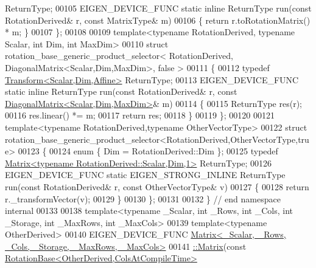 \begin{DoxyCode}
      ReturnType;
00105   EIGEN\_DEVICE\_FUNC \textcolor{keyword}{static} \textcolor{keyword}{inline} ReturnType run(\textcolor{keyword}{const} RotationDerived& r, \textcolor{keyword}{const} MatrixType& m)
00106   \{ \textcolor{keywordflow}{return} r.toRotationMatrix() * m; \}
00107 \};
00108 
00109 \textcolor{keyword}{template}<\textcolor{keyword}{typename} RotationDerived, \textcolor{keyword}{typename} Scalar, \textcolor{keywordtype}{int} Dim, \textcolor{keywordtype}{int} MaxDim>
00110 \textcolor{keyword}{struct }rotation\_base\_generic\_product\_selector< RotationDerived, DiagonalMatrix<Scalar,Dim,MaxDim>, false >
00111 \{
00112   \textcolor{keyword}{typedef} \hyperlink{group___geometry___module_class_eigen_1_1_transform}{Transform<Scalar,Dim,Affine>} ReturnType;
00113   EIGEN\_DEVICE\_FUNC \textcolor{keyword}{static} \textcolor{keyword}{inline} ReturnType run(\textcolor{keyword}{const} RotationDerived& r, \textcolor{keyword}{const} 
      \hyperlink{group___core___module_class_eigen_1_1_diagonal_matrix}{DiagonalMatrix<Scalar,Dim,MaxDim>}& m)
00114   \{
00115     ReturnType res(r);
00116     res.linear() *= m;
00117     \textcolor{keywordflow}{return} res;
00118   \}
00119 \};
00120 
00121 \textcolor{keyword}{template}<\textcolor{keyword}{typename} RotationDerived,\textcolor{keyword}{typename} OtherVectorType>
00122 \textcolor{keyword}{struct }rotation\_base\_generic\_product\_selector<RotationDerived,OtherVectorType,true>
00123 \{
00124   \textcolor{keyword}{enum} \{ Dim = RotationDerived::Dim \};
00125   \textcolor{keyword}{typedef} \hyperlink{group___core___module_class_eigen_1_1_matrix}{Matrix<typename RotationDerived::Scalar,Dim,1>} 
      ReturnType;
00126   EIGEN\_DEVICE\_FUNC \textcolor{keyword}{static} EIGEN\_STRONG\_INLINE ReturnType run(\textcolor{keyword}{const} RotationDerived& r, \textcolor{keyword}{const} 
      OtherVectorType& v)
00127   \{
00128     \textcolor{keywordflow}{return} r.\_transformVector(v);
00129   \}
00130 \};
00131 
00132 \} \textcolor{comment}{// end namespace internal}
00133 
00138 \textcolor{keyword}{template}<\textcolor{keyword}{typename} \_Scalar, \textcolor{keywordtype}{int} \_Rows, \textcolor{keywordtype}{int} \_Cols, \textcolor{keywordtype}{int} \_Storage, \textcolor{keywordtype}{int} \_MaxRows, \textcolor{keywordtype}{int} \_MaxCols>
00139 \textcolor{keyword}{template}<\textcolor{keyword}{typename} OtherDerived>
00140 EIGEN\_DEVICE\_FUNC \hyperlink{group___core___module_a11f852d66fa55b2aed12aa22da807a6b}{Matrix<\_Scalar, \_Rows, \_Cols, \_Storage, \_MaxRows, \_MaxCols>}
00141 \hyperlink{group___core___module_a11f852d66fa55b2aed12aa22da807a6b}{::Matrix}(\textcolor{keyword}{const} \hyperlink{class_eigen_1_1_rotation_base}{RotationBase<OtherDerived,ColsAtCompileTime>}

\end{DoxyCode}
